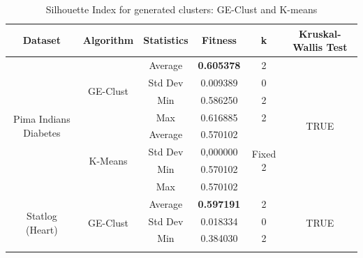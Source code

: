 \documentclass[conference,compsoc]{IEEEtran}
\begin{document}
\begin{table}[]
	\centering
	\caption{Silhouette Index for generated clusters: GE-Clust and K-means}
	\label{results-ge-and-kmeans}
	\begin{tabular}{|c|c|c|c|c|c|}
		\hline
		\textbf{Dataset}           & \textbf{Algorithm} & \textbf{Statistics} & \textbf{Fitness} & \textbf{k}    & \textbf{Kruskal-Wallis Test}   \\ \hline
		\multirow{8}{*}{Pima Indians Diabetes} & \multirow{4}{*}{GE-Clust}           & Average                        & \textbf{0.605378}                    & 2                        & \multirow{8}{*}{TRUE} \\ \cline{3-5}
		&                               & Std Dev                        & 0.009389                    & 0                        &                       \\ \cline{3-5}
		&                               & Min                            & 0.586250                    & 2                        &                       \\ \cline{3-5}
		&                               & Max                            & 0.616885                   & 2                        &                       \\ \cline{2-5}
		& \multirow{4}{*}{K-Means}      & Average                        & 0.570102                   & \multirow{4}{*}{Fixed 2} &                       \\ \cline{3-4}
		&                               & Std Dev                        & 0,000000                   &                          &                       \\ \cline{3-4}
		&                               & Min                            & 0.570102                   &                          &                       \\ \cline{3-4}
		&                               & Max                            & 0.570102                   &                          &                       \\ \hline
		\multirow{8}{*}{Statlog (Heart)}       & \multirow{4}{*}{GE-Clust}           & Average                        & \textbf{0.597191}                    & 2                        & \multirow{8}{*}{TRUE} \\ \cline{3-5}
		&                               & Std Dev                        & 0.018334                    & 0                        &                       \\ \cline{3-5}
		&                               & Min                            & 0.384030                    & 2                        &                       \\ \cline{3-5}

\end{tabular}
\end{table}
\end{document}
